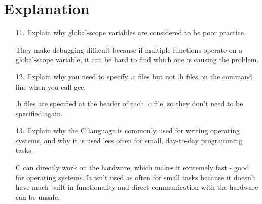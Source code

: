 \documentclass{article}
\begin{document}
\section*{Explanation}
\begin{itemize}
	\item[11.] Explain why global-scope variables are considered to be poor practice.
		\begin{answer*}
			They make debugging difficult because if multiple functions operate on a global-scope variable, it can be hard to find which one is causing the problem.
			
		\end{answer*}

	\item[12.] Explain why you need to specify .c files but not .h files on the command line when you call gcc.
		\begin{answer*}
			.h files are specified at the header of each .c file, so they don't need to be specified again.
			
		\end{answer*}

	\item[13.] Explain why the C language is commonly used for writing operating systems, and why it is used less often for small, day-to-day programming tasks.
		\begin{answer*}
			C can directly work on the hardware, which makes it extremely fast - good for operating systems. It isn't used as often for small tasks because it doesn't have much built in functionality and direct communication with the hardware can be unsafe.
			
		\end{answer*}
\end{itemize}
\end{document}
